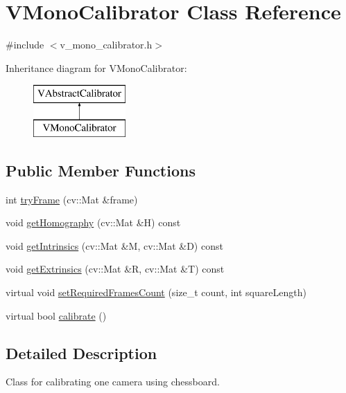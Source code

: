 \hypertarget{classVMonoCalibrator}{
\section{VMonoCalibrator Class Reference}
\label{classVMonoCalibrator}
}


{\ttfamily \#include $<$v\_\-mono\_\-calibrator.h$>$}

Inheritance diagram for VMonoCalibrator:\begin{figure}[H]
\begin{center}
\leavevmode
\includegraphics[height=2cm]{classVMonoCalibrator}
\end{center}
\end{figure}
\subsection*{Public Member Functions}
\begin{DoxyCompactItemize}
\item 
int \hyperlink{classVMonoCalibrator_a026938d74f2c8c2c6df06f8e50270b16}{tryFrame} (cv::Mat \&frame)
\item 
void \hyperlink{classVMonoCalibrator_a041c63fcebcf35b1277027c0d18a7d47}{getHomography} (cv::Mat \&H) const 
\item 
void \hyperlink{classVMonoCalibrator_a0acebdd3d00dcf56a5bbb119f6572ba8}{getIntrinsics} (cv::Mat \&M, cv::Mat \&D) const 
\item 
void \hyperlink{classVMonoCalibrator_a1a3aa1b57538d2bfd993ecf8c0b2e4fd}{getExtrinsics} (cv::Mat \&R, cv::Mat \&T) const 
\item 
virtual void \hyperlink{classVMonoCalibrator_ab3b2f7b28e77094385046d9eb53569ce}{setRequiredFramesCount} (size\_\-t count, int squareLength)
\item 
virtual bool \hyperlink{classVMonoCalibrator_a16cdc1f9c47d6437a124bd5f5a4ec426}{calibrate} ()
\end{DoxyCompactItemize}


\subsection{Detailed Description}
Class for calibrating one camera using chessboard.

